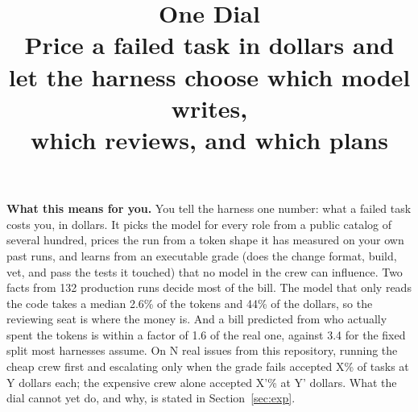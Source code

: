 
\title{\textbf{One Dial}\\[6pt]
\large Price a failed task in dollars and let the harness choose which model writes,\\
which reviews, and which plans}

\begin{center}
\begin{minipage}{0.92\textwidth}
\small
\noindent\textbf{What this means for you.}
You tell the harness one number: what a failed task costs you, in dollars. It picks the
model for every role from a public catalog of several hundred, prices the run from a
token shape it has measured on your own past runs, and learns from an executable grade
(does the change format, build, vet, and pass the tests it touched) that no model in the
crew can influence. Two facts from 132 production runs decide most of the bill. The
model that only reads the code takes a median 2.6\% of the tokens and 44\% of the
dollars, so the reviewing seat is where the money is. And a bill predicted from who
actually spent the tokens is within a factor of 1.6 of the real one, against 3.4 for the
fixed split most harnesses assume. On \textlangle N\textrangle{} real issues from this
repository, running the cheap crew first and escalating only when the grade fails
accepted \textlangle X\textrangle\% of tasks at \textlangle Y\textrangle{} dollars each; the
expensive crew alone accepted \textlangle X'\textrangle\% at \textlangle Y'\textrangle{}
dollars. What the dial cannot yet do, and why, is stated in Section~\ref{sec:exp}.
\end{minipage}
\end{center}

